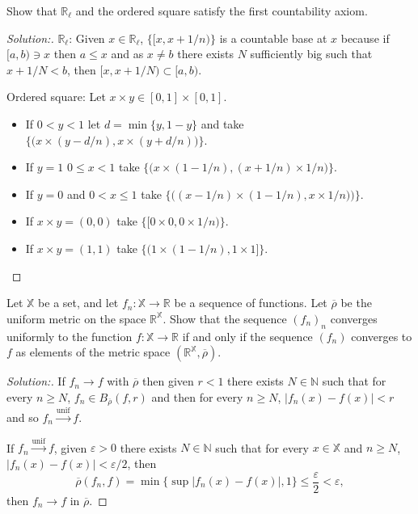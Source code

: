 \documentclass[a4paper,12pt, reqno]{article}
\theoremstyle{definition}
\newenvironment{exerr}[1]{
  \renewcommand\theexeralt{#1}
  \exeralt
}{\endexeralt}
\newenvironment{solution}{\begin{proof}[Solution:]}{\end{proof}}
\newcommand{\R}{\mathbb{R}}
\newcommand{\N}{\mathbb{N}}
\newcommand{\X}{\mathbb{X}}
\begin{document}
\begin{exerr}{4}
  Show that $\R_{\ell}$ and the ordered square satisfy the first countability axiom.
\end{exerr}
\begin{solution}
  $\R_{\ell}$: Given $x\in\R_{\ell}$, $\{ [x,x+1/n)  \}$ is a countable base at $x$ because if $[a,b)\ni x$ then $a\leq x$ and as $x\neq b$ there exists $N$ sufficiently big such that $x+1/N<b$, then $[x,x+1/N)\subset[a,b)$.

  Ordered square: Let $x\times y\in[0,1]\times[0,1]$.
  \begin{itemize}
    \item If $0<y<1$ let $d = \min\{ y,1-y \}$ and take $\Big\{ \big( x\times(y-d/n), x\times(y+d/n) \big)\Big\}$.
    \item If $y=1$ $0\leq x<1$ take $\Big\{ \big(x\times(1-1/n), (x+1/n)\times 1/n \big)\Big\}$.
    \item If $y=0$ and $0<x\leq 1$ take $\Big\{ \big( (x-1/n)\times(1-1/n), x\times 1/n) \big) \Big\}$.
    \item If $x\times y = (0,0)$ take $\Big\{ \big[0\times0, 0\times1/n \big) \Big\}$.
    \item If $x\times y = (1,1)$ take $\Big\{\big( 1\times(1-1/n),1\times1 \big]\Big\}$.
  \end{itemize}
\end{solution}

\begin{exerr}{7}
  Let $\X$ be a set, and let $f_{n}:\X\to\R$ be a sequence of functions. Let $\overline{\rho}$ be the uniform metric on the space $\R^\X$. Show that the sequence $(f_{n})_{n}$ converges uniformly to the function $f:\X\to\R$ if and only if the sequence $(f_{n})$ converges to $f$ as elements of the metric space $(\R^\X,\overline{\rho})$.
\end{exerr}
\begin{solution}
  If $f_{n}\to f$ with $\overline{\rho}$ then given $r<1$ there exists $N\in\N$ such that for every $n\geq N$, $f_{n}\in B_{\overline{\rho}}(f,r)$ and then for every $n\geq N$, $|f_{n}(x)-f(x)|<r$ and so $f_{n}\overset{\text{unif}}{\to}f$.

  If $f_{n}\overset{\text{unif}}{\to}f$, given $\varepsilon>0$ there exists $N\in\N$ such that for every $x\in\X$ and $n\geq N$, $|f_{n}(x)-f(x)|<\varepsilon/2$, then
  \begin{equation*}
    \overline{\rho}(f_{n},f) = \min\{ \sup |f_{n}(x)-f(x)|,1 \}\leq \frac{\varepsilon}{2}<\varepsilon,
  \end{equation*}
  then $f_{n}\to f$ in $\overline{\rho}$.
\end{solution}
\end{document}
